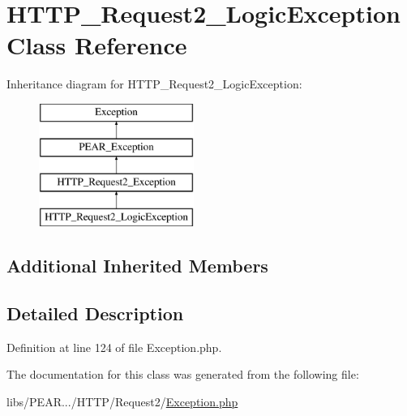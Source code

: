 \hypertarget{classHTTP__Request2__LogicException}{}\section{H\+T\+T\+P\+\_\+\+Request2\+\_\+\+Logic\+Exception Class Reference}
\label{classHTTP__Request2__LogicException}
Inheritance diagram for H\+T\+T\+P\+\_\+\+Request2\+\_\+\+Logic\+Exception\+:\begin{figure}[H]
\begin{center}
\leavevmode
\includegraphics[height=4.000000cm]{classHTTP__Request2__LogicException}
\end{center}
\end{figure}
\subsection*{Additional Inherited Members}


\subsection{Detailed Description}


Definition at line 124 of file Exception.\+php.



The documentation for this class was generated from the following file\+:\begin{DoxyCompactItemize}
\item 
libs/\+P\+E\+A\+R.../\+H\+T\+T\+P/\+Request2/\hyperlink{HTTP_2Request2_2Exception_8php}{Exception.\+php}\end{DoxyCompactItemize}
